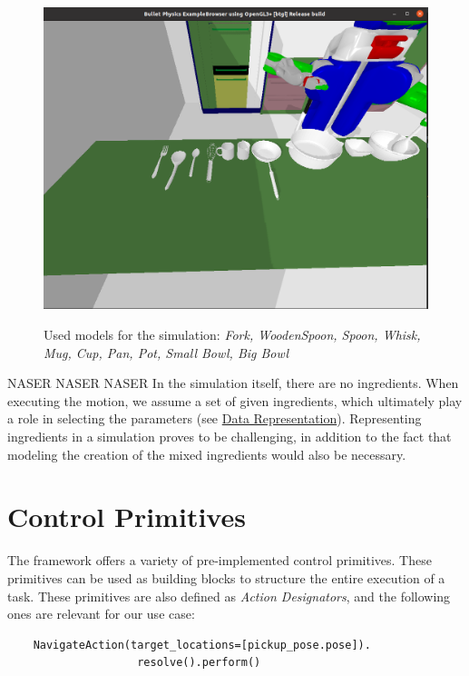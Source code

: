 \begin{figure}[H]
    \includegraphics[scale=0.35]{Graphics/toolscontainersmodels.png}
    \label{fig:toolscontainersmodels}
    \caption{Used models for the simulation: \textit{Fork, WoodenSpoon, Spoon, Whisk, Mug, Cup, Pan, Pot, Small Bowl, Big Bowl}}
\end{figure}

NASER NASER NASER
In the simulation itself, there are no ingredients. When executing the motion, we assume a set of given ingredients, which ultimately play a role in selecting the parameters (see \hyperref[chap:Data_representation]{Data Representation}). Representing ingredients in a simulation proves to be challenging, in addition to the fact that modeling the creation of the mixed ingredients would also be necessary.
\section{Control Primitives}
The framework  \cite{pycram} offers a variety of pre-implemented control primitives. These primitives can be used as building blocks to structure the entire execution of a task. These primitives are also defined as \textit{Action Designators}, and the following ones are relevant for our use case:

\begin{lstlisting}
	NavigateAction(target_locations=[pickup_pose.pose]).
					resolve().perform()
\end{lstlisting}

\newpage

